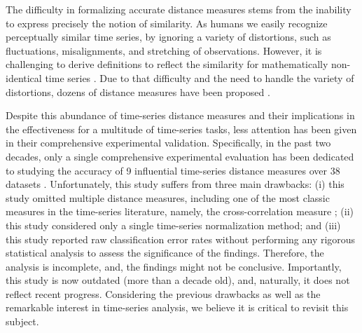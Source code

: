 \documentclass[11pt]{article}
\begin{document}
The difficulty in formalizing accurate distance measures stems from the inability to express precisely the notion of similarity. As humans we easily recognize perceptually similar time series, by ignoring a variety of distortions, such as fluctuations, misalignments, and stretching of observations. However, it is challenging to derive definitions to reflect the similarity for mathematically non-identical time series \cite{esling2012time}. Due to that difficulty and the need to handle the variety of distortions, dozens of distance measures have been proposed \cite{assfalg2006similarity,berndt1994using,chen2004marriage,chen2005robust,chen2007spade,ding2008querying,Faloutsos1994fast,frentzos2007index,morse2007efficient,stefan2013move,vlachos2002discovering,paparrizos2015k,paparrizos2019grail,sakoe1978dynamic}.

Despite this abundance of time-series distance measures and their implications in the effectiveness for a multitude of time-series tasks, less attention has been given in their comprehensive experimental validation. Specifically, in the past two decades, only a single comprehensive experimental evaluation has been dedicated to studying the accuracy of 9 influential time-series distance measures over 38 datasets \cite{ding2008querying}. Unfortunately, this study suffers from three main drawbacks: (i) this study omitted multiple distance measures, including one of the most classic measures in the time-series literature, namely, the cross-correlation measure \cite{papoulis1962fourier,bracewell1965pentagram}; (ii) this study considered only a single time-series normalization method; and (iii) this study reported raw classification error rates without performing any rigorous statistical analysis to assess the significance of the findings. Therefore, the analysis is incomplete, and, the findings might not be conclusive. Importantly, this study is now outdated (more than a decade old), and, naturally, it does not reflect recent progress. Considering the previous drawbacks as well as the remarkable interest in time-series analysis, we believe it is critical to revisit this subject.
\end{document}
